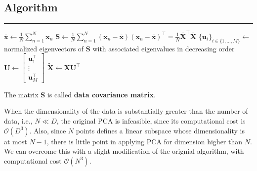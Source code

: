 \documentclass{article}
\begin{document}
    \subsection{Algorithm}
        \begin{algorithm}[H]\label{alg:PCA}
            \DontPrintSemicolon

            \caption{Principal component analysis}


            \BlankLine
            \hrule
            $\overline{\textbf{x}} \leftarrow \frac{1}{N}\sum_{n=1}^{N}\textbf{x}_n$\;
            $\textbf{S} \leftarrow \frac{1}{N}\sum_{n=1}^{N}(\textbf{x}_n-\overline{\textbf{x}})(\textbf{x}_n-\overline{\textbf{x}})^{\top} = \frac{1}{N}\overline{\textbf{X}}^\top\overline{\textbf{X}}$\;
            $\{\textbf{u}_i\}_{i \in \{1,\dots,M\}} \leftarrow$ normalized eigenvectors of \textbf{S} with associated eigenvalues in decreasing order\;
            \BlankLine
            $\textbf{U} \leftarrow \begin{bmatrix} \textbf{u}_1^\top \\ \vdots \\ \textbf{u}_M^\top \end{bmatrix}$\;
            \BlankLine
            $\tilde{\textbf{X}} \leftarrow \textbf{X}\textbf{U}^\top$\;
        \end{algorithm}
        The matrix \textbf{S} is called \textbf{data covariance matrix}.

        When the dimensionality of the data is substantially greater than the number of data, i.e., $N \ll D$,
        the original PCA is infeasible, since its computational cost is $\mathcal{O}(D^3)$. Also, since $N$ points defines a linear subspace whose dimensionality is at most $N-1$,
        there is little point in applying PCA for dimension higher than $N$.
        We can overcome this with a slight modification of the orignial algorithm, with computational cost $\mathcal{O}(N^3)$.
\end{document}
